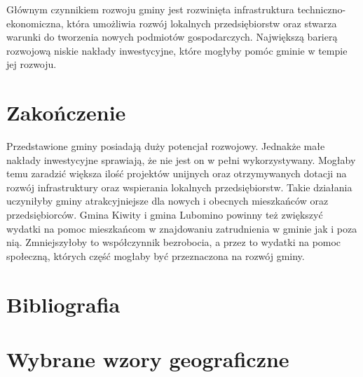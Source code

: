\documentclass[a4paper,10pt]{article}
\begin{document}
    Głównym czynnikiem rozwoju gminy jest rozwinięta infrastruktura techniczno-ekonomiczna, 
    która umożliwia rozwój lokalnych przedsiębiorstw oraz stwarza warunki do tworzenia nowych podmiotów gospodarczych.
    Największą barierą rozwojową niskie nakłady inwestycyjne, które mogłyby pomóc gminie w tempie jej rozwoju.

\newpage    
\section{Zakończenie}
  Przedstawione gminy posiadają duży potencjał rozwojowy. Jednakże małe nakłady inwestycyjne sprawiają, że nie jest on w pełni wykorzystywany. 
  Mogłaby temu zaradzić większa ilość projektów unijnych oraz otrzymywanych dotacji na rozwój infrastruktury oraz wspierania lokalnych przedsiębiorstw. 
  Takie działania uczyniłyby gminy atrakcyjniejsze dla nowych i obecnych mieszkańców oraz przedsiębiorców.
  Gmina Kiwity i gmina Lubomino powinny też zwiększyć wydatki na pomoc mieszkańcom w znajdowaniu zatrudnienia w gminie jak i poza nią. 
  Zmniejszyłoby to współczynnik bezrobocia, a przez to wydatki na pomoc społeczną, których część mogłaby być przeznaczona na rozwój gminy.

\newpage
\section{Bibliografia}
\section{Wybrane wzory geograficzne}
\end{document}
